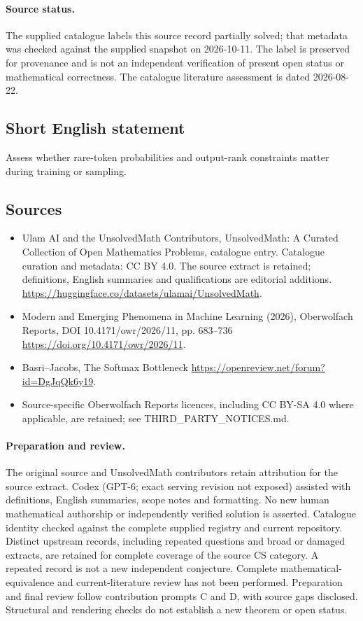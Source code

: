 \documentclass[11pt]{article}
\begin{document}
\paragraph{Source status.}
The supplied catalogue labels this source record partially solved; that metadata was checked against the supplied snapshot on 2026-10-11. The label is preserved for provenance and is not an independent verification of present open status or mathematical correctness. The catalogue literature assessment is dated 2026-08-22.
\subsection{Short English statement}
Assess whether rare-token probabilities and output-rank constraints matter during training or sampling.
\subsection{Sources}
\begin{itemize}
\item[S1] Ulam AI and the UnsolvedMath Contributors, UnsolvedMath: A Curated Collection of Open Mathematics Problems, catalogue entry. Catalogue curation and metadata: CC BY 4.0. The source extract is retained; definitions, English summaries and qualifications are editorial additions.
\url{https://huggingface.co/datasets/ulamai/UnsolvedMath}.
\item[S2] Modern and Emerging Phenomena in Machine Learning (2026), Oberwolfach Reports, DOI 10.4171/owr/2026/11, pp. 683--736
\url{https://doi.org/10.4171/owr/2026/11}.
\item[S3] Basri--Jacobs, The Softmax Bottleneck
\url{https://openreview.net/forum?id=DgJqQk6y19}.
\item Source-specific Oberwolfach Reports licences, including CC BY-SA 4.0 where applicable, are retained; see THIRD\_PARTY\_NOTICES.md.
\end{itemize}
\paragraph{Preparation and review.}
The original source and UnsolvedMath contributors retain attribution for the source extract. Codex (GPT-6; exact serving revision not exposed) assisted with definitions, English summaries, scope notes and formatting. No new human mathematical authorship or independently verified solution is asserted. Catalogue identity checked against the complete supplied registry and current repository. Distinct upstream records, including repeated questions and broad or damaged extracts, are retained for complete coverage of the source CS category. A repeated record is not a new independent conjecture. Complete mathematical-equivalence and current-literature review has not been performed. Preparation and final review follow contribution prompts C and D, with source gaps disclosed. Structural and rendering checks do not establish a new theorem or open status.
\label{end:statement}
\end{document}
